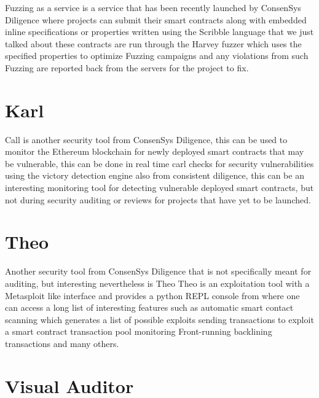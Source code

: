 Fuzzing as a service is a service that has been recently launched by ConsenSys Diligence where projects can submit their smart contracts along with embedded inline specifications or properties written using the Scribble language that we just talked about these contracts are run through the Harvey fuzzer which uses the specified properties to optimize Fuzzing campaigns and any violations from such Fuzzing are reported back from the servers for the project to fix.

\section{Karl}

Call is another security tool from ConsenSys Diligence, this can be used to monitor the Ethereum blockchain for newly deployed smart contracts that may be vulnerable, this can be done in real time carl checks for security vulnerabilities using the victory detection engine also from consistent diligence, this can be an interesting monitoring tool for detecting vulnerable deployed smart contracts, but not during security auditing or reviews for projects that have yet to be launched.

\section{Theo}

Another security tool from ConsenSys Diligence that is not specifically meant for auditing, but interesting nevertheless is Theo Theo is an exploitation tool with a Metasploit like interface and provides a python REPL console from where one can access a long list of interesting features such as automatic smart contact scanning which generates a list of possible exploits sending transactions to exploit a smart contract transaction pool monitoring Front-running backlining transactions and many others.

\section{Visual Auditor}

